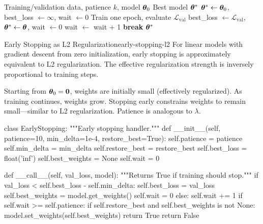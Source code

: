 \documentclass[../../main.tex]{subfiles}
\begin{document}
\begin{algorithm}[htbp]
\caption{Early Stopping}
\label{alg:early-stopping}
\begin{algorithmic}[1]
\Require Training/validation data, patience $k$, model $\boldsymbol{\theta}_0$
\Ensure Best model $\boldsymbol{\theta}^*$
\State $\boldsymbol{\theta}^* \gets \boldsymbol{\theta}_0$, best\_loss $\gets \infty$, wait $\gets 0$
    \State Train one epoch, evaluate $\mathcal{L}_{\text{val}}$
        \State best\_loss $\gets \mathcal{L}_{\text{val}}$, $\boldsymbol{\theta}^* \gets \boldsymbol{\theta}$, wait $\gets 0$
    \Else
        \State wait $\gets$ wait + 1
            \State \textbf{break}
        \EndIf
    \EndIf
\EndFor
\State \Return $\boldsymbol{\theta}^*$
\end{algorithmic}
\end{algorithm}

\begin{theorem}{Early Stopping as L2 Regularization}{early-stopping-l2}
For linear models with gradient descent from zero initialization, early stopping is approximately equivalent to L2 regularization. The effective regularization strength is inversely proportional to training steps.
\end{theorem}

\begin{intuition}
Starting from $\boldsymbol{\theta}_0 = \mathbf{0}$, weights are initially small (effectively regularized). As training continues, weights grow. Stopping early constrains weights to remain small---similar to L2 regularization. Patience is analogous to $\lambda$.
\end{intuition}

\begin{pythoncode}
class EarlyStopping:
    """Early stopping handler."""
    def __init__(self, patience=10, min_delta=1e-4, restore_best=True):
        self.patience = patience
        self.min_delta = min_delta
        self.restore_best = restore_best
        self.best_loss = float('inf')
        self.best_weights = None
        self.wait = 0

    def __call__(self, val_loss, model):
        """Returns True if training should stop."""
        if val_loss < self.best_loss - self.min_delta:
            self.best_loss = val_loss
            self.best_weights = model.get_weights()
            self.wait = 0
        else:
            self.wait += 1
            if self.wait >= self.patience:
                if self.restore_best and self.best_weights is not None:
                    model.set_weights(self.best_weights)
                return True
        return False
\end{pythoncode}
\end{document}
